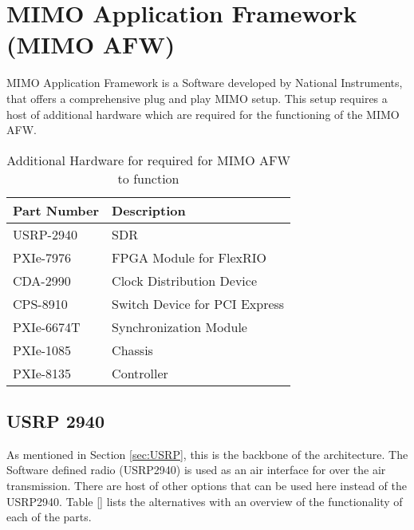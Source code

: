 \section{MIMO Application Framework (MIMO AFW)}\label{sec:MIMOAFW}
MIMO Application Framework is a Software developed by National Instruments, that offers a comprehensive plug and play MIMO setup. This setup requires a host of additional hardware which are required for the functioning of the MIMO AFW. \cite{MIMOAFWGettingStarted}
\begin{table}[H]
    \begin{center}
        \begin{tabular}{|l|l|}
        \hline
            \textbf{Part Number} & \textbf{Description}          \\ \hline
            USRP-2940            & SDR                           \\ \hline
            PXIe-7976            & FPGA Module for FlexRIO       \\ \hline
            CDA-2990             & Clock Distribution Device     \\ \hline
            CPS-8910             & Switch Device for PCI Express \\ \hline
            PXIe-6674T           & Synchronization Module        \\ \hline
            PXIe-1085            & Chassis                       \\ \hline
            PXIe-8135            & Controller                    \\ \hline
        \end{tabular}
    \end{center}
    \caption{Additional Hardware for required for MIMO AFW to function}
    \label{tb:MIMOAFWPartsList}
\end{table}

\subsection{USRP 2940}\label{MIMOAFWUSRP}
As mentioned in Section \ref{sec:USRP}, this is the backbone of the architecture. The Software defined radio (USRP2940) is used as an air interface for over the air transmission. There are host of other options that can be used here instead of the USRP2940. Table \ref{} lists the alternatives with an overview of the functionality of each of the parts.


